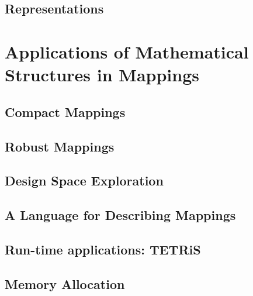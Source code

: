 \documentclass[
		twoside,openright,titlepage,numbers=noenddot,headinclude,%
	 	footinclude=true,cleardoublepage=empty,
		dottedtoc, %
		BCOR=5mm,paper=a4,fontsize=10pt, %
		ngerman,american, %
		]{scrreprt}
\begin{document}
\section{Representations}
\label{sec:representations}
%

\chapter{Applications of Mathematical Structures in Mappings}
\label{chap:mapping_applications}

\section{Compact Mappings}
\label{sec:compact}
\section{Robust Mappings}
\label{sec:design_centering}
\section{Design Space Exploration}
\label{sec:dse}
%
\section{A Language for Describing Mappings}
\label{sec:logic_language}
\section{Run-time applications: TETRiS}
\label{sec:tetris}
\section{Memory Allocation}
\label{sec:memory}

%
%
%
\end{document}
